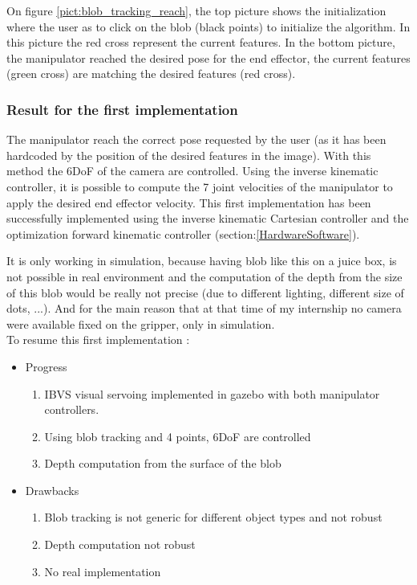 On figure \ref{pict:blob_tracking_reach}, the top picture shows the initialization where the user as to click on the blob (black points) to initialize the algorithm. In this picture the red cross represent the current features. In the bottom picture, the manipulator reached the desired pose for the end effector, the current features (green cross) are matching the desired features (red cross). 

\subsubsection{Result for the first implementation}

The manipulator reach the correct pose requested by the user (as it has been hardcoded by the position of the desired features in the image). With this method the 6DoF of the camera are controlled. Using the inverse kinematic controller, it is possible to compute the 7 joint velocities of the manipulator to apply the desired end effector velocity. This first implementation has been successfully implemented using the inverse kinematic Cartesian controller and the optimization forward kinematic controller (section:\ref{HardwareSoftware}). 

It is only working in simulation, because having blob like this on a juice box, is not possible in real environment and the computation of the depth from the size of this blob would be really not precise (due to different lighting, different size of dots, ...). And for the main reason that at that time of my internship no camera were available fixed on the gripper, only in simulation.\\

To resume this first implementation :
\begin{itemize}
    \item Progress
    \begin{enumerate}
        \item IBVS visual servoing implemented in gazebo with both manipulator controllers.
        \item Using blob tracking and 4 points, 6DoF are controlled
        \item Depth computation from the surface of the blob
    \end{enumerate}
    \item Drawbacks
    \begin{enumerate}
        \item Blob tracking is not generic for different object types and not robust
        \item Depth computation not robust
        \item No real implementation
    \end{enumerate}
\end{itemize}

